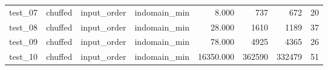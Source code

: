 \begin{longtable}{l l l l r r r r}
    test\_07         & chuffed         & input\_order      & indomain\_min     & 8.000              & 737            & 672               & 20             \\
    test\_08         & chuffed         & input\_order      & indomain\_min     & 28.000             & 1610           & 1189              & 37             \\
    test\_09         & chuffed         & input\_order      & indomain\_min     & 78.000             & 4925           & 4365              & 26             \\
    test\_10         & chuffed         & input\_order      & indomain\_min     & 16350.000          & 362590         & 332479            & 51             \\
\end{longtable}

